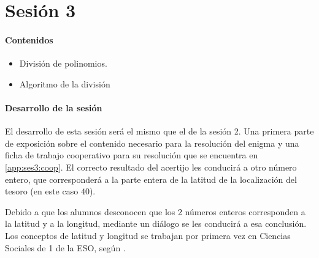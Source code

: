 




\section{Sesión 3}

\paragraph{Contenidos}
\begin{itemize}
	\item División de polinomios.
	\item Algoritmo de la división
\end{itemize}

\paragraph{Desarrollo de la sesión}

El desarrollo de esta sesión será el mismo que el de la sesión 2.
%
Una primera parte de exposición sobre el contenido necesario para la resolución del enigma y una ficha de trabajo cooperativo para su resolución que se encuentra en \ref{app:ses3:coop}.
%
El correcto resultado del acertijo les conducirá a otro número entero, que corresponderá a la parte entera de la latitud de la localización del tesoro (en este caso $40$).

Debido a que los alumnos desconocen que los 2 números enteros corresponden a la latitud y a la longitud, mediante un diálogo se les conducirá a esa conclusión.
%
Los conceptos de latitud y longitud se trabajan por primera vez en Ciencias Sociales de 1 de la ESO, según \bocm.



